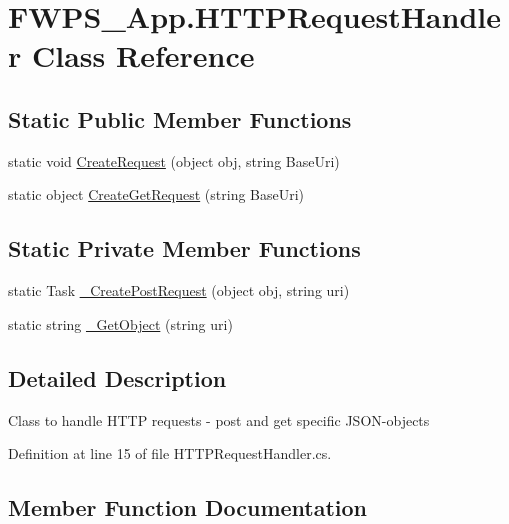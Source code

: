 \hypertarget{class_f_w_p_s___app_1_1_h_t_t_p_request_handler}{}\section{F\+W\+P\+S\+\_\+\+App.\+H\+T\+T\+P\+Request\+Handler Class Reference}
\label{class_f_w_p_s___app_1_1_h_t_t_p_request_handler}
\subsection*{Static Public Member Functions}
\begin{DoxyCompactItemize}
\item 
static void \mbox{\hyperlink{class_f_w_p_s___app_1_1_h_t_t_p_request_handler_a5a68754334dc0ad8df5e6febcadbd558}{Create\+Request}} (object obj, string Base\+Uri)
\item 
static object \mbox{\hyperlink{class_f_w_p_s___app_1_1_h_t_t_p_request_handler_a1c961955cb33fe6ea77efde8e5a76581}{Create\+Get\+Request}} (string Base\+Uri)
\end{DoxyCompactItemize}
\subsection*{Static Private Member Functions}
\begin{DoxyCompactItemize}
\item 
static Task \mbox{\hyperlink{class_f_w_p_s___app_1_1_h_t_t_p_request_handler_a05d07ba97f37820482be19565a20c25f}{\+\_\+\+Create\+Post\+Request}} (object obj, string uri)
\item 
static string \mbox{\hyperlink{class_f_w_p_s___app_1_1_h_t_t_p_request_handler_a01ea783a9badd889725885945cf5c728}{\+\_\+\+Get\+Object}} (string uri)
\end{DoxyCompactItemize}


\subsection{Detailed Description}
Class to handle H\+T\+TP requests -\/ post and get specific J\+S\+O\+N-\/objects 

Definition at line 15 of file H\+T\+T\+P\+Request\+Handler.\+cs.



\subsection{Member Function Documentation}
\mbox{\label{class_f_w_p_s___app_1_1_h_t_t_p_request_handler_a05d07ba97f37820482be19565a20c25f}} 
